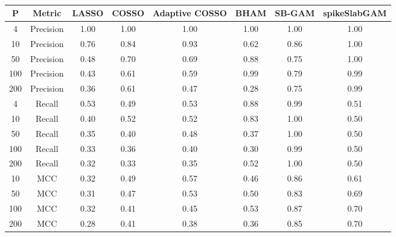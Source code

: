 \begin{table}[ht]
\centering
\begin{tabular}{cccccccc}
  \hline
P & Metric & LASSO & COSSO & Adaptive COSSO & BHAM & SB-GAM & spikeSlabGAM \\ 
  \hline
  4 & Precision & 1.00 & 1.00 & 1.00 & 1.00 & 1.00 & 1.00 \\ 
   10 & Precision & 0.76 & 0.84 & 0.93 & 0.62 & 0.86 & 1.00 \\ 
   50 & Precision & 0.48 & 0.70 & 0.69 & 0.88 & 0.75 & 1.00 \\ 
  100 & Precision & 0.43 & 0.61 & 0.59 & 0.99 & 0.79 & 0.99 \\ 
  200 & Precision & 0.36 & 0.61 & 0.47 & 0.28 & 0.75 & 0.99 \\ 
    4 & Recall & 0.53 & 0.49 & 0.53 & 0.88 & 0.99 & 0.51 \\ 
   10 & Recall & 0.40 & 0.52 & 0.52 & 0.83 & 1.00 & 0.50 \\ 
   50 & Recall & 0.35 & 0.40 & 0.48 & 0.37 & 1.00 & 0.50 \\ 
  100 & Recall & 0.33 & 0.36 & 0.40 & 0.30 & 0.99 & 0.50 \\ 
  200 & Recall & 0.32 & 0.33 & 0.35 & 0.52 & 1.00 & 0.50 \\ 
   10 & MCC & 0.32 & 0.49 & 0.57 & 0.46 & 0.86 & 0.61 \\ 
   50 & MCC & 0.31 & 0.47 & 0.53 & 0.50 & 0.83 & 0.69 \\ 
  100 & MCC & 0.32 & 0.41 & 0.45 & 0.53 & 0.87 & 0.70 \\ 
  200 & MCC & 0.28 & 0.41 & 0.38 & 0.36 & 0.85 & 0.70 \\ 
   \hline
\end{tabular}
\caption{} 
\label{tab:sim_gaus_var_select}
\end{table}
